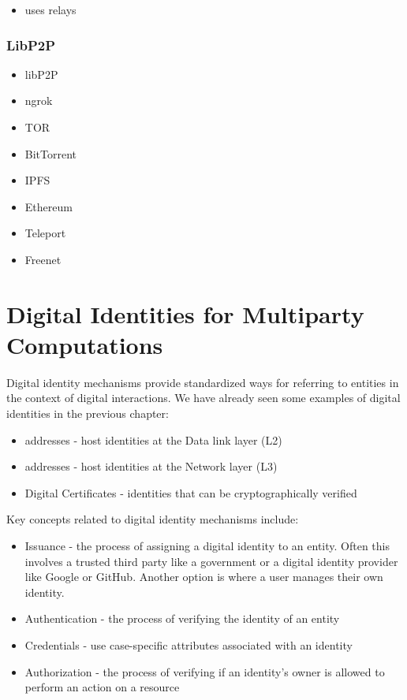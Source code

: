 
\begin{itemize}
\tightlist
\item
  uses relays
\end{itemize}

\subsection{LibP2P}\label{thesis__022-overlays.md__libp2p}

\begin{itemize}
\tightlist
\item
  libP2P
\item
  ngrok
\item
  TOR
\item
  BitTorrent
\item
  IPFS
\item
  Ethereum
\item
  Teleport
\item
  Freenet
\end{itemize}

\label{thesis__025-identity.md}
\chapter{Digital Identities for Multiparty Computations}\label{thesis__025-identity.md__digital-identities-for-multiparty-computations}

Digital identity mechanisms provide standardized ways for referring to entities in the context of digital interactions. We have already seen some examples of digital identities in the previous chapter:

\begin{itemize}
\tightlist
\item
   addresses - host identities at the Data link layer (L2)
\item
   addresses - host identities at the Network layer (L3)
\item
  Digital Certificates - identities that can be cryptographically verified
\end{itemize}

Key concepts related to digital identity mechanisms include:

\begin{itemize}
\tightlist
\item
  Issuance - the process of assigning a digital identity to an entity. Often this involves a trusted third party like a government or a digital identity provider like Google or GitHub. Another option is  where a user manages their own identity.
\item
  Authentication - the process of verifying the identity of an entity
\item
  Credentials - use case-specific attributes associated with an identity
\item
  Authorization - the process of verifying if an identity's owner is allowed to perform an action on a resource
\end{itemize}

